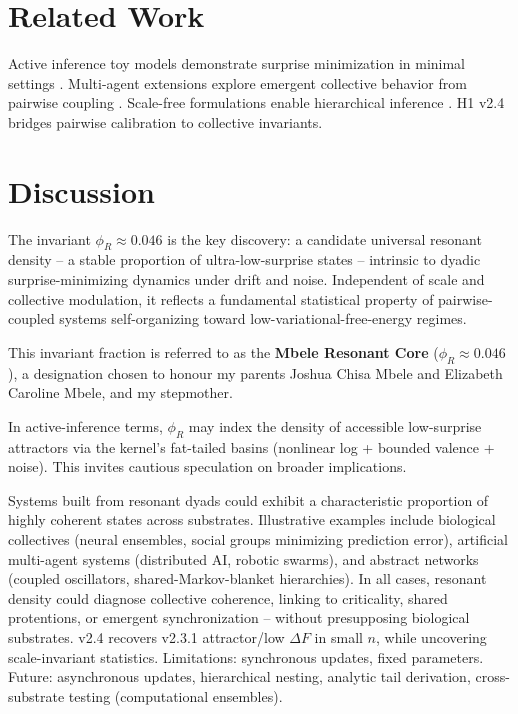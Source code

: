 \documentclass[11pt,a4paper]{article}
\begin{document}
	\section{Related Work}
	Active inference toy models demonstrate surprise minimization in minimal settings \citep{friston2010free}. Multi-agent extensions explore emergent collective behavior from pairwise coupling \citep{maisto2025flock, ruizserra2025factorised}. Scale-free formulations enable hierarchical inference \citep{friston2025scalefree}. H1 v2.4 bridges pairwise calibration to collective invariants.
	\section{Discussion}
	The invariant $\phi_R \approx 0.046$ is the key discovery: a candidate universal resonant density -- a stable proportion of ultra-low-surprise states -- intrinsic to dyadic surprise-minimizing dynamics under drift and noise. Independent of scale and collective modulation, it reflects a fundamental statistical property of pairwise-coupled systems self-organizing toward low-variational-free-energy regimes.
	
	This invariant fraction is referred to as the \textbf{Mbele Resonant Core} ($\phi_R \approx 0.046$), a designation chosen to honour my parents Joshua Chisa Mbele and Elizabeth Caroline Mbele, and my stepmother.
	
	In active-inference terms, $\phi_R$ may index the density of accessible low-surprise attractors via the kernel's fat-tailed basins (nonlinear log + bounded valence + noise). This invites cautious speculation on broader implications. 
	
	Systems built from resonant dyads could exhibit a characteristic proportion of highly coherent states across substrates. Illustrative examples include biological collectives (neural ensembles, social groups minimizing prediction error), artificial multi-agent systems (distributed AI, robotic swarms), and abstract networks (coupled oscillators, shared-Markov-blanket hierarchies). In all cases, resonant density could diagnose collective coherence, linking to criticality, shared protentions, or emergent synchronization -- without presupposing biological substrates.
	v2.4 recovers v2.3.1 attractor/low $\Delta F$ in small $n$, while uncovering scale-invariant statistics. Limitations: synchronous updates, fixed parameters. Future: asynchronous updates, hierarchical nesting, analytic tail derivation, cross-substrate testing (computational ensembles).
	\appendix
\end{document}
